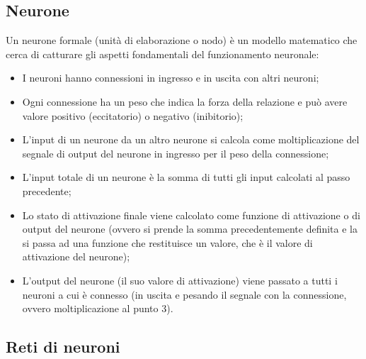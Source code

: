 \subsection{Neurone}

Un neurone formale (unità di elaborazione o nodo) è un modello matematico che
cerca di catturare gli aspetti fondamentali del funzionamento neuronale:
\begin{itemize}
\item I neuroni hanno connessioni in ingresso e in uscita con altri neuroni;
\item Ogni connessione ha un peso che indica la forza della relazione e può
avere valore positivo (eccitatorio) o negativo (inibitorio);
\item L'input di un neurone da un altro neurone si calcola come moltiplicazione
del segnale di output del neurone in ingresso per il peso della connessione;
\item L'input totale di un neurone è la somma di tutti gli input calcolati al 
passo precedente;
\item Lo stato di attivazione finale viene calcolato come funzione di
attivazione o di output del neurone (ovvero si prende la somma precedentemente
definita e la si passa ad una funzione che restituisce un valore, che è il
valore di attivazione del neurone);
\item L'output del neurone (il suo valore di attivazione) viene passato a tutti
i neuroni a cui è connesso (in uscita e pesando il segnale con la connessione,
ovvero moltiplicazione al punto 3).
\end{itemize}

\subsection{Reti di neuroni}

